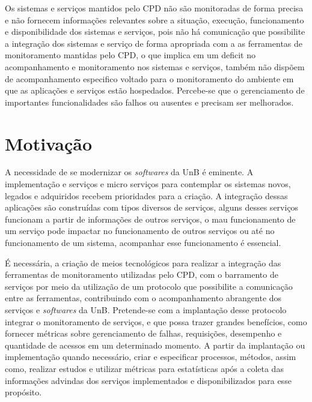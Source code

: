 Os sistemas e serviços mantidos pelo \acrshort{CPD} não são monitoradas de forma precisa e não fornecem informações relevantes sobre a situação, execução, funcionamento e disponibilidade dos sistemas e serviços, pois não há comunicação que possibilite a integração dos sistemas e serviço de forma apropriada com a as ferramentas de monitoramento mantidas pelo \acrshort{CPD}, o que implica em um deficit no acompanhamento e monitoramento nos sistemas e serviços, também não dispõem de acompanhamento especifico voltado para o monitoramento do ambiente em que as aplicações e serviços estão hospedados. Percebe-se que o gerenciamento de importantes funcionalidades são falhos ou ausentes e precisam ser melhorados.


\section{Motivação}

A necessidade de se modernizar os \textit{softwares} da \acrshort{UnB} é eminente. A implementação e serviços e micro serviços para contemplar os sistemas novos, legados e adquiridos recebem prioridades para a criação. A integração dessas aplicações são construídas com tipos diversos de serviços, alguns desses serviços funcionam a partir de informações de  outros serviços, o mau funcionamento de um serviço pode impactar no funcionamento de outros serviços ou até no funcionamento de um sistema, acompanhar esse funcionamento é essencial.      

É necessária, a criação de meios tecnológicos para realizar a integração das ferramentas de monitoramento utilizadas pelo \acrshort{CPD}, com o barramento de serviços por meio da utilização de um protocolo que possibilite a comunicação entre as ferramentas, contribuindo com o acompanhamento abrangente dos serviços e \textit{softwares} da \acrshort{UnB}. Pretende-se com a implantação desse protocolo integrar o monitoramento de serviços, e que possa trazer grandes benefícios, como fornecer métricas sobre gerenciamento de falhas, requisições, desempenho e quantidade de acessos em um determinado momento. A partir da implantação ou implementação quando necessário, criar e especificar processos, métodos, assim como, realizar estudos e utilizar métricas para estatísticas após a coleta das informações advindas dos serviços implementados e disponibilizados para esse propósito.


